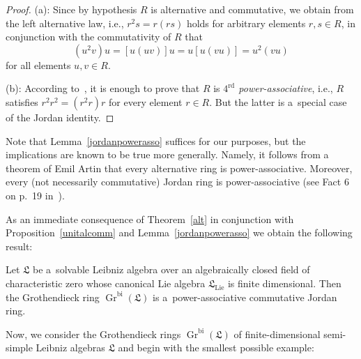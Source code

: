 \documentclass{jonasart}
\DeclareMathOperator{\bi}{bi}
\DeclareMathOperator{\K}{Gr}
\DeclareMathOperator{\lie}{Lie}
\newcommand{\lf}{\mathfrak{L}}
\begin{document}
	\begin{proof}
		(a): Since by hypothesis $R$ is alternative and commutative, we obtain from the left alternative law, i.e., $r^2 s=r(rs)$ holds for arbitrary elements $r,s\in R$, in conjunction with the commutativity of $R$ that
		\[
			(u^2 v)u=[u(uv)]u=u[u(vu)]=u^2 (vu)
		\]
		for all elements $u,v\in R$.

		(b): According to~\cite[Lemmas 3 and 4]{A}, it is enough to prove that $R$ is {\em
		$4^\textrm{rd}$ power-associative\/}, i.e., $R$ satisfies $r^2 r^2 =(r^2 r)r$ for every element $r\in R$. But the latter is a~special case of the Jordan identity.
	\end{proof}

	\begin{remark}
		{Note that Lemma~\ref{jordanpowerasso} suffices for our purposes, but the implications are known to be true more generally. Namely, it follows from a theorem of Emil Artin that every alternative ring is power-associative. Moreover, every (not necessarily commutative) Jordan ring is power-associative (see Fact
		6 on p.\ 19 in~\cite{BMS}).}
	\end{remark}
	As an immediate consequence of Theorem~\ref{alt} in conjunction with
	Proposition~\ref{unitalcomm} and Lemma~\ref{jordanpowerasso} we obtain the following result:
	\begin{corollary}\label{alt2}
		Let $\lf$ be a~solvable Leibniz algebra over an algebraically closed field of characteristic zero whose canonical Lie algebra $\lf_{\lie}$ is finite dimensional. Then the Grothendieck ring $\K^{\bi}(\lf)$ is a~power-associative commutative Jordan ring.
	\end{corollary}
	Now, we consider the Grothendieck rings $\K^{\bi}(\lf)$ of finite-dimensional semi-simple Leibniz algebras $\lf$ and begin with the smallest possible example:
\end{document}
